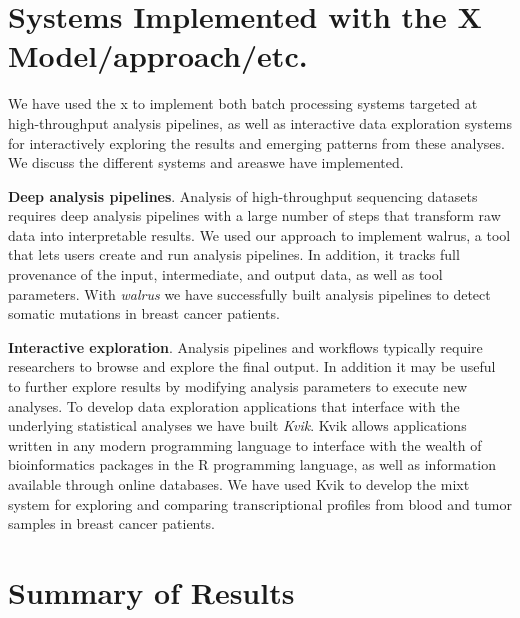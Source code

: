 \section{Systems Implemented with the X Model/approach/etc.} 
We have used the \gls{x} to implement both batch processing systems targeted at
high-throughput analysis pipelines, as well as interactive data
exploration systems for interactively exploring the results and emerging
patterns from these analyses.  We discuss the different systems and areaswe have
implemented. 

\textbf{Deep analysis pipelines}. 
Analysis of high-throughput sequencing datasets requires deep analysis pipelines
with a large number of steps that transform raw data into interpretable
results\cite{diao2015building}. We used our approach to implement walrus, a tool
that lets users create and run analysis pipelines. In addition, it tracks full
provenance of the input, intermediate, and output data, as well as tool
parameters. With \emph{walrus} we have successfully built analysis pipelines to
detect somatic mutations in breast cancer patients. 

\textbf{Interactive exploration}. Analysis pipelines and workflows typically
require researchers to browse and explore the final output. In addition it may
be useful to further explore results by modifying analysis parameters to execute
new analyses.  To develop data exploration applications that interface with the
underlying statistical analyses we have built \emph{Kvik}. Kvik allows
applications written in any modern programming language to interface with the
wealth of bioinformatics packages in the R programming language, as well as
information available through online databases. We have used Kvik to develop the
\gls{mixt} system for exploring and comparing transcriptional profiles from
blood and tumor samples in breast cancer patients. 


\section{Summary of Results} 

